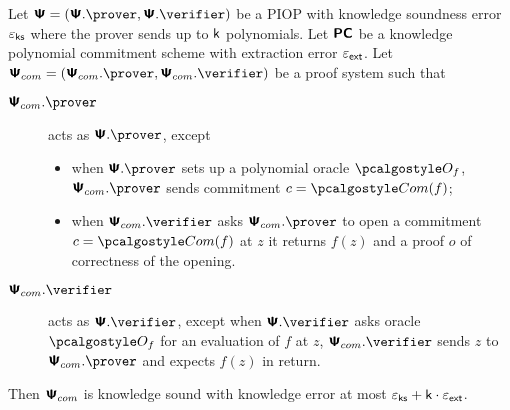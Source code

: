 \documentclass[runningheads,11pt]{llncs}
\begin{document}
\begin{lemma}
  Let $\PS = (\PS.\prover, \PS.\verifier)$ be a PIOP with knowledge soundness error
  $\varepsilon_{\mathsf{ks}}$ where the prover sends up to $\mathsf{k}$ polynomials. Let $\bm{\mathsf{PC}}$ be a
  knowledge polynomial commitment scheme with extraction error $\varepsilon_{\mathsf{ext}}$. Let
  $\PSc = (\PSc.\prover, \PSc.\verifier)$ be a proof system such that
  \begin{description}
  \item[$\PSc.\prover$] acts as $\PS.\prover$, except
    \begin{itemize}
    \item when $\PS.\prover$ sets up a polynomial oracle $\oracleo_f$,
      $\PSc.\prover$ sends commitment $c = \com(f)$;
    \item when $\PSc.\verifier$ asks $\PSc.\prover$ to open a commitment
      $c = \com(f)$ at $z$ it returns $f(z)$ and a proof $o$ of correctness of
      the opening.
  \end{itemize}
  \item[$\PSc.\verifier$] acts as $\PS.\verifier$, except when $\PS.\verifier$
    asks oracle $\oracleo_f$ for an evaluation of $f$ at $z$, $\PSc.\verifier$
    sends $z$ to $\PSc.\prover$ and expects $f(z)$ in return.
  \end{description}
  Then $\bm{\mathsf{\Psi}}_{com}$ is knowledge sound with knowledge error at most $\varepsilon_{\mathsf{ks}} + \mathsf{k} \cdot \varepsilon_{\mathsf{ext}}$.
\end{lemma}
\end{document}
